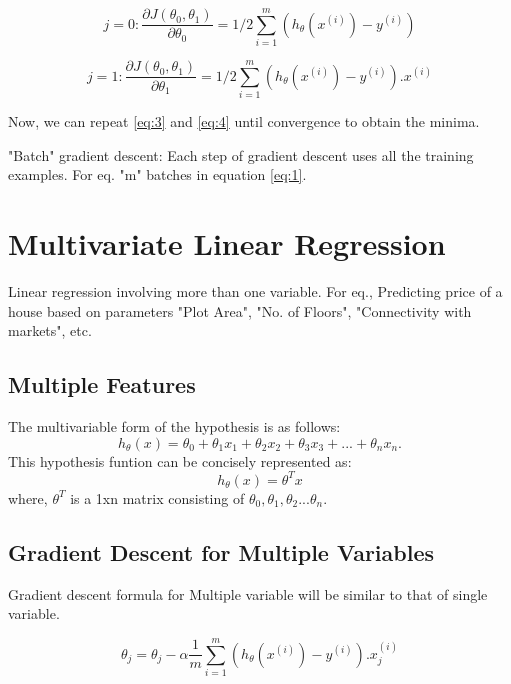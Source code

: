 \documentclass[12pt, A4]{report}
\begin{document}
    \begin{equation} \label {eq:3}
        j = 0 : \frac{\partial {J(\theta_0, \theta_1)}}{\partial \theta_0} = 1/2 \sum_{i=1}^{m} (h_\theta(x^{(i)})-y^{(i)}) 
    \end{equation}

    \begin{equation} \label {eq:4}
        j = 1 : \frac{\partial {J(\theta_0, \theta_1)}}{\partial \theta_1} = 1/2 \sum_{i=1}^{m} (h_\theta(x^{(i)})-y^{(i)}).x^{(i)}
    \end{equation}

    Now, we can repeat \ref{eq:3} and \ref{eq:4} until convergence to obtain the minima.

    "Batch" gradient descent: Each step of gradient descent uses all the training examples.
    For eq. "m" batches in equation \ref{eq:1}.


\section*{Multivariate Linear Regression}
  Linear regression involving more than one variable. For eq., Predicting price of a house based on parameters "Plot Area", "No. of Floors", "Connectivity with markets", etc.

  \subsection*{Multiple Features}
    The multivariable form of the hypothesis is as follows:
    \begin{equation} \label {eq:5}
        h_\theta(x) = \theta_0 + \theta_1x_1 + \theta_2x_2 + \theta_ 3x_3 + ... + \theta_{n}x_n.    
    \end{equation}
    This hypothesis funtion can be concisely represented as:
    \begin{equation}
        h_\theta(x) = \theta^{T}x
    \end{equation}
    where, $ \theta^T $ is a 1xn matrix consisting of $ \theta_0, \theta_1, \theta_2 ... \theta_n $.


  \subsection*{Gradient Descent for Multiple Variables}
    Gradient descent formula for Multiple variable will be similar to that of single variable.

    \begin{equation} \label {eq: GD for multiple}
        \theta_j =  \theta_j - \alpha \frac{1}{m} \sum_{i=1}^{m} (h_\theta(x^{(i)})-y^{(i)}).x_j^{(i)}
    \end{equation}
\end{document}
